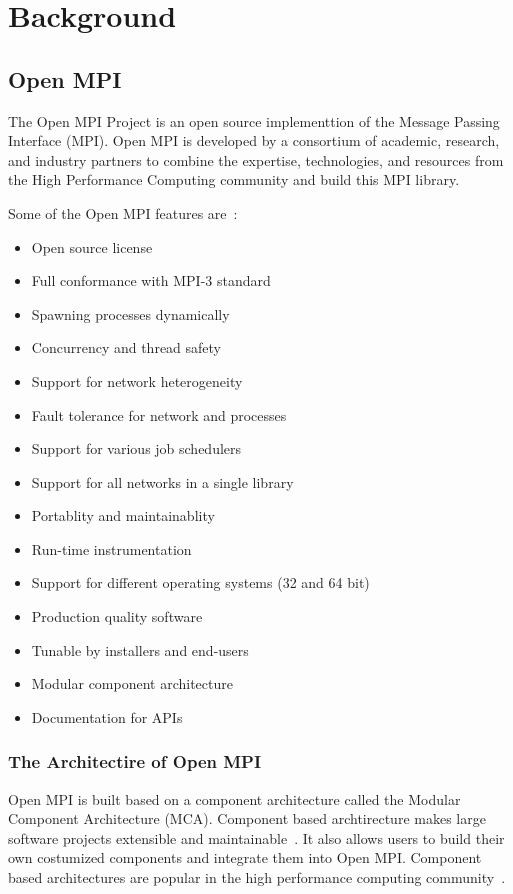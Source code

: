 \chapter{Background}
\label{sec:Background}

\section{Open MPI}
\label{sec:openmpi}
The Open MPI Project is an open source implementtion of the Message Passing Interface (MPI). Open MPI is developed by a consortium of academic, research, and industry partners to combine the expertise, technologies, and resources from the High Performance Computing community and build this MPI library.

Some of the Open MPI features are~\cite{openmpi}:
\begin{itemize}
  \item Open source license
  \item Full conformance with MPI-3 standard
  \item Spawning processes dynamically
  \item Concurrency and thread safety
  \item Support for network heterogeneity
  \item Fault tolerance for network and processes
  \item Support for various job schedulers
  \item Support for all networks in a single library
  \item Portablity and maintainablity
  \item Run-time instrumentation
  \item Support for different operating systems (32 and 64 bit)
  \item Production quality software
  \item Tunable by installers and end-users
  \item Modular component architecture
  \item Documentation for APIs
\end{itemize}
    
\subsection{The Architectire of Open MPI}
Open MPI is built based on a component architecture called the Modular Component Architecture (MCA). Component based archtirecture makes large software projects extensible and maintainable~\cite{barrett2005analysis,graham2006open}. It also allows users to build their own costumized components and integrate them into Open MPI. Component based architectures are popular in the high performance computing community~\cite{squyres2003component,bernholdt2006component}.


